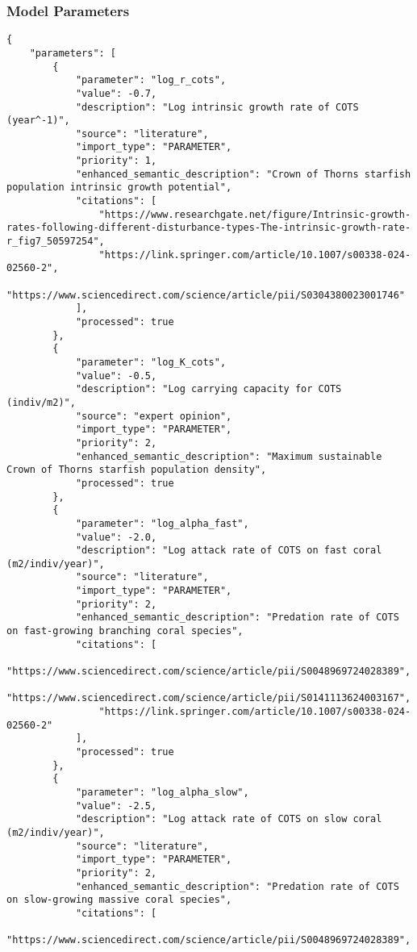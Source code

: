 \subsubsection{Model Parameters}
\begin{lstlisting}
{
    "parameters": [
        {
            "parameter": "log_r_cots",
            "value": -0.7,
            "description": "Log intrinsic growth rate of COTS (year^-1)",
            "source": "literature",
            "import_type": "PARAMETER",
            "priority": 1,
            "enhanced_semantic_description": "Crown of Thorns starfish population intrinsic growth potential",
            "citations": [
                "https://www.researchgate.net/figure/Intrinsic-growth-rates-following-different-disturbance-types-The-intrinsic-growth-rate-r_fig7_50597254",
                "https://link.springer.com/article/10.1007/s00338-024-02560-2",
                "https://www.sciencedirect.com/science/article/pii/S0304380023001746"
            ],
            "processed": true
        },
        {
            "parameter": "log_K_cots",
            "value": -0.5,
            "description": "Log carrying capacity for COTS (indiv/m2)",
            "source": "expert opinion",
            "import_type": "PARAMETER",
            "priority": 2,
            "enhanced_semantic_description": "Maximum sustainable Crown of Thorns starfish population density",
            "processed": true
        },
        {
            "parameter": "log_alpha_fast",
            "value": -2.0,
            "description": "Log attack rate of COTS on fast coral (m2/indiv/year)",
            "source": "literature",
            "import_type": "PARAMETER",
            "priority": 2,
            "enhanced_semantic_description": "Predation rate of COTS on fast-growing branching coral species",
            "citations": [
                "https://www.sciencedirect.com/science/article/pii/S0048969724028389",
                "https://www.sciencedirect.com/science/article/pii/S0141113624003167",
                "https://link.springer.com/article/10.1007/s00338-024-02560-2"
            ],
            "processed": true
        },
        {
            "parameter": "log_alpha_slow",
            "value": -2.5,
            "description": "Log attack rate of COTS on slow coral (m2/indiv/year)",
            "source": "literature",
            "import_type": "PARAMETER",
            "priority": 2,
            "enhanced_semantic_description": "Predation rate of COTS on slow-growing massive coral species",
            "citations": [
                "https://www.sciencedirect.com/science/article/pii/S0048969724028389",

\end{lstlisting}
